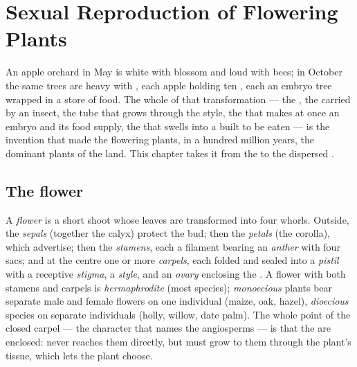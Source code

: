 \chapter{Sexual Reproduction of Flowering Plants}\label{ch:b2:angiosperm-reproduction}

An apple orchard in May is white with blossom and loud with bees;
in October the same trees are heavy with , each apple holding
ten , each  an embryo tree wrapped in a store of food. The
whole of that transformation --- the , the  carried by an
insect, the tube that grows through the style, the  that makes at once an embryo and its food supply, the
 that swells into a  built to be eaten --- is the invention
that made the flowering plants, in a hundred million years, the
dominant plants of the land. This chapter takes it from the  to
the dispersed .

\section{The flower}

\begin{definition}\label{def:b2:angiosperm-reproduction:flower}
A \emph{flower} is a short shoot whose leaves are transformed into
four whorls. Outside, the \emph{sepals} (together the calyx) protect
the bud; then the \emph{petals} (the corolla), which advertise; then
the \emph{stamens}, each a filament bearing an \emph{anther} with
four  sacs; and at the centre one or more \emph{carpels},
each folded and sealed into a \emph{pistil} with a receptive
\emph{stigma}, a \emph{style}, and an \emph{ovary} enclosing the
\emph{}. A flower with both stamens and carpels is
\emph{hermaphrodite} (most species); \emph{monoecious} plants bear
separate male and female flowers on one individual (maize, oak,
hazel), \emph{dioecious} species on separate individuals (holly,
willow, date palm). The whole point of the closed carpel --- the
character that names the angiosperms --- is that the  are
enclosed:  never reaches them directly, but must grow to them
through the plant's tissue, which lets the plant choose.
\end{definition}

